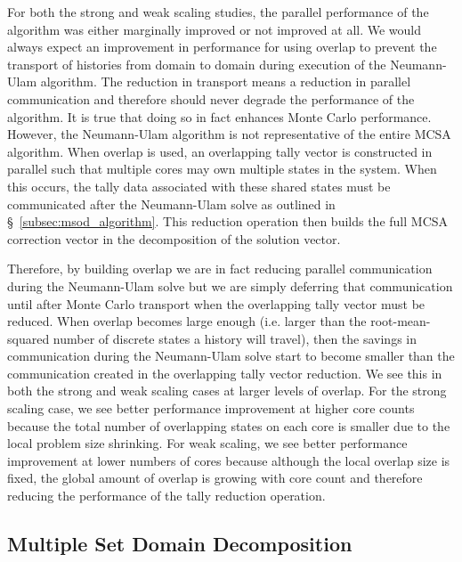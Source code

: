 For both the strong and weak scaling studies, the parallel performance
of the algorithm was either marginally improved or not improved at
all. We would always expect an improvement in performance for using
overlap to prevent the transport of histories from domain to domain
during execution of the Neumann-Ulam algorithm. The reduction in
transport means a reduction in parallel communication and therefore
should never degrade the performance of the algorithm. It is true that
doing so in fact enhances Monte Carlo performance. However, the
Neumann-Ulam algorithm is not representative of the entire MCSA
algorithm. When overlap is used, an overlapping tally vector is
constructed in parallel such that multiple cores may own multiple
states in the system. When this occurs, the tally data associated with
these shared states must be communicated after the Neumann-Ulam solve
as outlined in \S~\ref{subsec:msod_algorithm}. This reduction
operation then builds the full MCSA correction vector in the
decomposition of the solution vector. 

Therefore, by building overlap we are in fact reducing parallel
communication during the Neumann-Ulam solve but we are simply
deferring that communication until after Monte Carlo transport when
the overlapping tally vector must be reduced. When overlap becomes
large enough (i.e. larger than the root-mean-squared number of
discrete states a history will travel), then the savings in
communication during the Neumann-Ulam solve start to become smaller
than the communication created in the overlapping tally vector
reduction. We see this in both the strong and weak scaling cases at
larger levels of overlap. For the strong scaling case, we see better
performance improvement at higher core counts because the total number
of overlapping states on each core is smaller due to the local problem
size shrinking. For weak scaling, we see better performance
improvement at lower numbers of cores because although the local
overlap size is fixed, the global amount of overlap is growing with
core count and therefore reducing the performance of the tally
reduction operation.

\subsection{Multiple Set Domain Decomposition}
\label{subsec:ms_decomposition}

